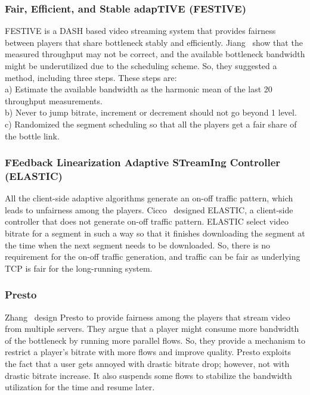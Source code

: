 \subsubsection{Fair, Efficient, and Stable adapTIVE (FESTIVE)}
FESTIVE\cite{10.1145/2413176.2413189} is a DASH based video streaming system that provides fairness between players that share bottleneck stably and efficiently. Jiang \etal\ show that the measured throughput may not be correct, and the available bottleneck bandwidth might be underutilized due to the scheduling scheme. So, they suggested a method, including three steps. These steps are:\\
a) Estimate the available bandwidth as the harmonic mean of the last 20 throughput measurements.\\
b) Never to jump bitrate, increment or decrement should not go beyond 1 level. \\
c) Randomized the segment scheduling so that all the players get a fair share of the bottle link.

\subsubsection{FEedback Linearization Adaptive STreamIng Controller (ELASTIC)}
All the client-side adaptive algorithms generate an on-off traffic pattern, which leads to unfairness among the players. Cicco \etal\ designed ELASTIC\cite{6691442}, a client-side controller that does not generate on-off traffic pattern. ELASTIC select video bitrate for a segment in such a way so that it finishes downloading the segment at the time when the next segment needs to be downloaded. So, there is no requirement for the on-off traffic generation, and traffic can be fair as underlying TCP is fair for the long-running system.

\subsubsection{Presto}
Zhang \etal\ design Presto\cite{7249417} to provide fairness among the players that stream video from multiple servers. They argue that a player might consume more bandwidth of the bottleneck by running more parallel flows. So, they provide a mechanism to restrict a player's bitrate with more flows and improve quality. Presto exploits the fact that a user gets annoyed with drastic bitrate drop; however, not with drastic bitrate increase\cite{10.1145/2018602.2018611}. It also suspends some flows to stabilize the bandwidth utilization for the time and resume later.

